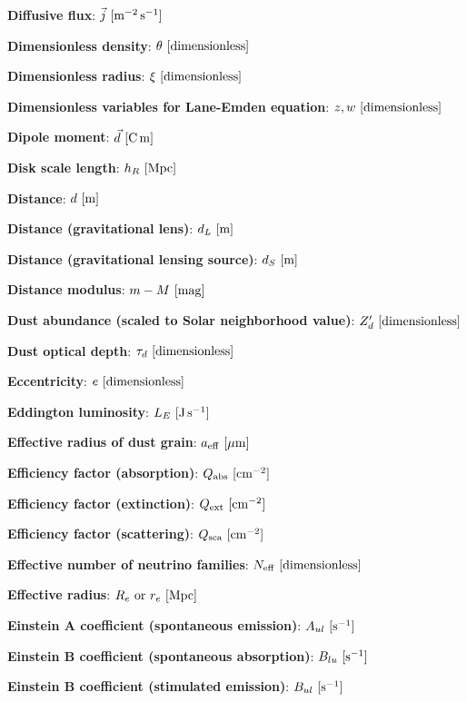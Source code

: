 \documentclass[a4paper,10pt]{article}
\begin{document}
{\noindent}\textbf{Diffusive flux}: $\vec{j} ~ [{\rm m^{-2}\,s^{-1}}]$

{\noindent}\textbf{Dimensionless density}: $\theta ~ [{\rm dimensionless}]$

{\noindent}\textbf{Dimensionless radius}: $\xi ~ [{\rm dimensionless}]$

{\noindent}\textbf{Dimensionless variables for Lane-Emden equation}: $z, w ~ [{\rm dimensionless}]$

{\noindent}\textbf{Dipole moment}: $\vec{d} ~ [{\rm C\,m}]$

{\noindent}\textbf{Disk scale length}: $h_R ~ [{\rm Mpc}]$

{\noindent}\textbf{Distance}: $d ~ [{\rm m}]$

{\noindent}\textbf{Distance (gravitational lens)}: $d_L ~ [{\rm m}]$

{\noindent}\textbf{Distance (gravitational lensing source)}: $d_S ~ [{\rm m}]$

{\noindent}\textbf{Distance modulus}: $m - M ~ [{\rm mag}]$

{\noindent}\textbf{Dust abundance (scaled to Solar neighborhood value)}: $Z_d' ~ [{\rm dimensionless}]$

{\noindent}\textbf{Dust optical depth}: $\tau_d ~ [{\rm dimensionless}]$

{\noindent}\textbf{Eccentricity}: $e ~ [{\rm dimensionless}]$

{\noindent}\textbf{Eddington luminosity}: $L_E ~ [{\rm J\,s^{-1}}]$

{\noindent}\textbf{Effective radius of dust grain}: $a_{\rm eff} ~ [{\rm \mu m}]$

{\noindent}\textbf{Efficiency factor (absorption)}: $Q_{\rm abs} ~ [{\rm cm^{-2}}]$

{\noindent}\textbf{Efficiency factor (extinction)}: $Q_{\rm ext} ~ [{\rm cm^{-2}}]$

{\noindent}\textbf{Efficiency factor (scattering)}: $Q_{\rm sca} ~ [{\rm cm^{-2}}]$

{\noindent}\textbf{Effective number of neutrino families}: $N_\mathrm{eff} ~ [{\rm dimensionless}]$

{\noindent}\textbf{Effective radius}: $R_e~{\rm or}~r_e ~ [{\rm Mpc}]$

{\noindent}\textbf{Einstein A coefficient (spontaneous emission)}: $A_{ul} ~ [{\rm s^{-1}}]$

{\noindent}\textbf{Einstein B coefficient (spontaneous absorption)}: $B_{lu} ~ [{\rm s^{-1}}]$

{\noindent}\textbf{Einstein B coefficient (stimulated emission)}: $B_{ul} ~ [{\rm s^{-1}}]$
\end{document}
